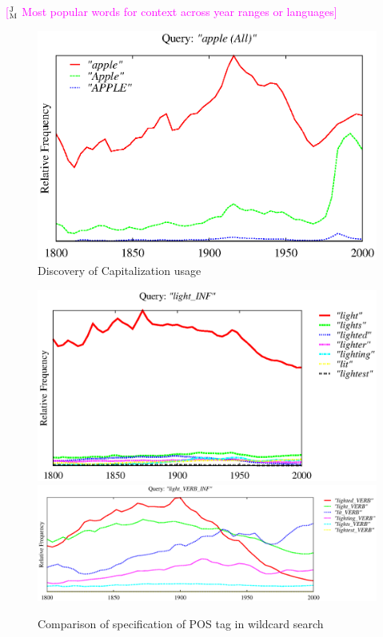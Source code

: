 \documentclass[11pt]{article}
\newcommand{\jmcomment}[1]{\textcolor{magenta}{[$^{\textsc{J}}_{\textsc{M}}$ #1]}}
\begin{document}
\jmcomment{Most popular words for context across year ranges or languages}
\begin{figure}
\centering
\includegraphics[width=.48\textwidth]{graphs/apple}
\caption{\label{fig:apple} Discovery of Capitalization usage}
\end{figure}
\begin{figure}
\includegraphics[width=.48\textwidth]{graphs/light_INF}
\includegraphics[width=.48\textwidth]{graphs/light_INF_VERB}
\caption{\label{fig:light} Comparison of specification of POS tag in wildcard search}
\end{figure}
\end{document}
